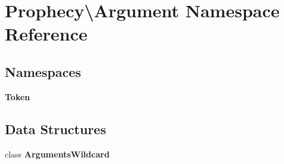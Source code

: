 \section{Prophecy\textbackslash{}Argument Namespace Reference}
\label{namespace_prophecy_1_1_argument}
\subsection*{Namespaces}
\begin{DoxyCompactItemize}
\item 
 {\bf Token}
\end{DoxyCompactItemize}
\subsection*{Data Structures}
\begin{DoxyCompactItemize}
\item 
class {\bf Arguments\+Wildcard}
\end{DoxyCompactItemize}
